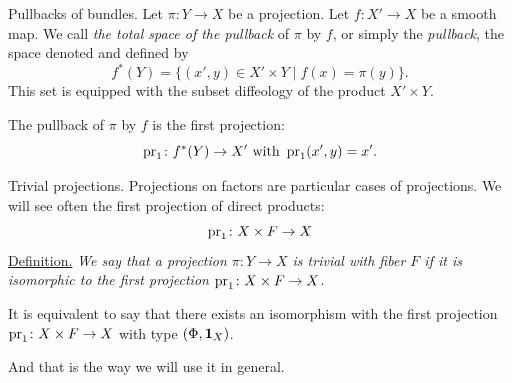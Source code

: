 \begin{Article}{Pullbacks of bundles.}{}
  Let $\pi \colon Y \to X$ be a projection.
  Let $f \colon X' \to X$ be a smooth map.
  We call \emph{the total space of the pullback} of $\pi$ by $f$,
  or simply the \emph{pullback},
  the space denoted and defined by
  $$%
    f^*(Y) = \{ (x',y) \in X' \times Y \mid f(x) = \pi(y) \}.
  $$%
  This set is equipped with the subset diffeology of the product $X' \times Y$.
  \begin{center}
  \end{center}
  The pullback of $\pi$ by $f$ is the first projection:
  $$%
    \Proj_1 \colon f^*(Y) \to X'
    \SpacedText{with}
    \Proj_1(x',y) = x'.
  $$%
\end{Article}

\begin{Article}{Trivial projections.}{}
  Projections on factors are particular cases of projections.
  We will see often the first projection of direct products:
  $$%
    \Proj_1 \colon X \times F \to X
  $$%
  \uline{Definition.} {\itshape We say that a projection $\pi \colon Y \to X$ is \emph{trivial with fiber $F$} if it is isomorphic to the first projection $\operatorname{pr}_1 \colon X \times F \to X$.}

  It is equivalent to say that there exists an isomorphism with the first projection $\operatorname{pr}_1 \colon X \times F \to X$ with type $(\Phi,{\mathbf{1}}_X)$.
  \begin{center}
  \end{center}
  And that is the way we will use it in general.
\end{Article}

